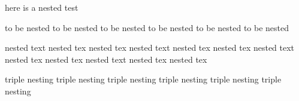 here is a nested test
\begin{one}
  to be nested to be nested
  to be nested to be nested
  to be nested to be nested
  \begin{two}
    nested text nested tex nested tex
    nested text nested tex nested tex
    nested text nested tex nested tex
    nested text nested tex nested tex
    \begin{three}
      triple nesting
      triple nesting
      triple nesting
      triple nesting
      triple nesting
      triple nesting
    \end{three}
    \end{two}
\end{one}
